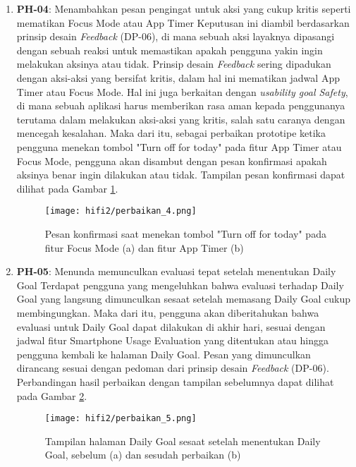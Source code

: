 \begin{enumerate}
  \item \textbf{PH-04}: Menambahkan pesan pengingat untuk aksi yang cukup kritis seperti mematikan Focus Mode atau App Timer
  \subitem Keputusan ini diambil berdasarkan prinsip desain \textit{Feedback} (DP-06), di mana sebuah aksi layaknya dipasangi dengan sebuah reaksi untuk memastikan apakah pengguna yakin ingin melakukan aksinya atau tidak. Prinsip desain \textit{Feedback} sering dipadukan dengan aksi-aksi yang bersifat kritis, dalam hal ini mematikan jadwal App Timer atau Focus Mode. Hal ini juga berkaitan dengan \textit{usability goal Safety}, di mana sebuah aplikasi harus memberikan rasa aman kepada penggunanya terutama dalam melakukan aksi-aksi yang kritis, salah satu caranya dengan mencegah kesalahan.
  \subitem Maka dari itu, sebagai perbaikan prototipe ketika pengguna menekan tombol "Turn off for today" pada fitur App Timer atau Focus Mode, pengguna akan disambut dengan pesan konfirmasi apakah aksinya benar ingin dilakukan atau tidak. Tampilan pesan konfirmasi dapat dilihat pada Gambar \ref{img:perbaikan_4}.

  \begin{figure}[h]
    \centering
    \texttt{[image: hifi2/perbaikan\_4.png]}
    \caption{Pesan konfirmasi saat menekan tombol "Turn off for today" pada fitur Focus Mode (a) dan fitur App Timer (b)}
    \label{img:perbaikan_4}
  \end{figure}
  \FloatBarrier

  \item \textbf{PH-05}: Menunda memunculkan evaluasi tepat setelah menentukan Daily Goal 
  \subitem Terdapat pengguna yang mengeluhkan bahwa evaluasi terhadap Daily Goal yang langsung dimunculkan sesaat setelah memasang Daily Goal cukup membingungkan. Maka dari itu, pengguna akan diberitahukan bahwa evaluasi untuk Daily Goal dapat dilakukan di akhir hari, sesuai dengan jadwal fitur Smartphone Usage Evaluation yang ditentukan atau hingga pengguna kembali ke halaman Daily Goal. Pesan yang dimunculkan dirancang sesuai dengan pedoman dari prinsip desain \textit{Feedback} (DP-06). Perbandingan hasil perbaikan dengan tampilan sebelumnya dapat dilihat pada Gambar \ref{img:perbaikan_5}.

  \begin{figure}[h]
    \centering
    \texttt{[image: hifi2/perbaikan\_5.png]}
    \caption{Tampilan halaman Daily Goal sesaat setelah menentukan Daily Goal, sebelum (a) dan sesudah perbaikan (b)}
    \label{img:perbaikan_5}
  \end{figure}
  \FloatBarrier
  

\end{enumerate}

